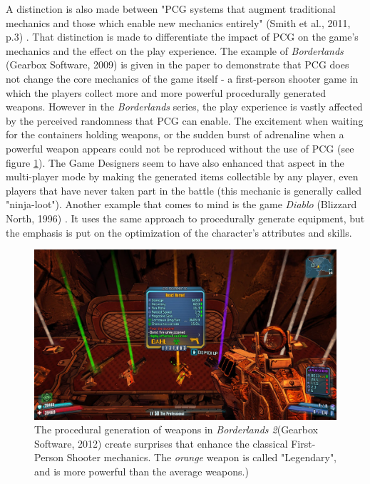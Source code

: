 A distinction is also made between "PCG systems that augment traditional mechanics and those which enable new mechanics entirely" (Smith et al., 2011, p.3) \cite{pdf:pcgbased}. That distinction is made to differentiate the impact of PCG on the game's mechanics and the effect on the play experience. The example of \textit{Borderlands} (Gearbox Software, 2009) \cite{game:border} is given in the paper to demonstrate that PCG does not change the core mechanics of the game itself - a first-person shooter game in which the players collect more and more powerful procedurally generated weapons. However in the \textit{Borderlands} series, the play experience is vastly affected by the perceived randomness that PCG can enable. The excitement when waiting for the containers holding weapons, or the sudden burst of adrenaline when a powerful weapon appears could not be reproduced without the use of PCG (see figure \ref{fig:Bl2}). The Game Designers seem to have also enhanced that aspect in the multi-player mode by making the generated items collectible by any player, even players that have never taken part in the battle (this mechanic is generally called "ninja-loot"). Another example that comes to mind is the game \textit{Diablo} (Blizzard North, 1996) \cite{game:diablo}. It uses the same approach to procedurally generate equipment, but the emphasis is put on the optimization of the character's attributes and skills. 

\begin{figure}[!ht]
    \centering
    \includegraphics[scale=0.15]{Images/Borderlands2.jpg}
    \caption{The procedural generation of weapons in \textit{Borderlands 2}(Gearbox Software, 2012) create surprises that enhance the classical First-Person Shooter mechanics. The \textit{orange} weapon is called "Legendary", and is more powerful than the average weapons.)\cite{pic:border}}
    \label{fig:Bl2}
\end{figure}

